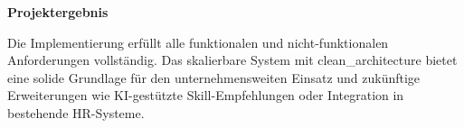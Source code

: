 \textbf{Projektergebnis}

Die Implementierung erfüllt alle funktionalen und nicht-funktionalen Anforderungen vollständig. Das skalierbare System mit \gls{clean_architecture} bietet eine solide Grundlage für den unternehmensweiten Einsatz und zukünftige Erweiterungen wie KI-gestützte Skill-Empfehlungen oder Integration in bestehende HR-Systeme.

\clearpage